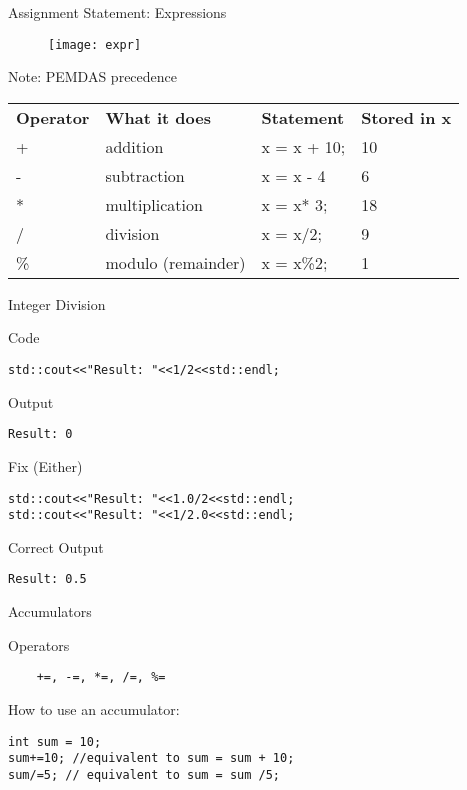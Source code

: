 \documentclass[xcolor={dvipsnames}]{beamer}
\begin{document}
\begin{frame}{Assignment Statement: Expressions}
\begin{figure}
	\texttt{[image: expr]}
\end{figure}

\begin{block}{Note: PEMDAS precedence}
	\begin{tabularx}{\textwidth}{X X X X}
		\textbf{Operator} & \textbf{What it does} & \textbf{Statement} & \textbf{Stored in x}\\
		+ & addition & x = x + 10; & 10 \\
		- & subtraction & x = x - 4 & 6 \\
		*& multiplication & x = x* 3; &  18 \\
		/ & division & x = x/2; & 9 \\
		\% & modulo (remainder) &  x = x\%2; & 1 \\  
	\end{tabularx}
\end{block}
\end{frame}

\begin{frame}[fragile]{Integer Division}
\begin{block}{Code}
\begin{verbatim}
std::cout<<"Result: "<<1/2<<std::endl;
\end{verbatim}
\end{block}
\pause
\begin{block}{Output}
\begin{verbatim}
Result: 0
\end{verbatim}
\end{block}
\pause
\begin{block}{Fix (Either)}
\begin{verbatim}
std::cout<<"Result: "<<1.0/2<<std::endl;
std::cout<<"Result: "<<1/2.0<<std::endl;
\end{verbatim}
\end{block}
\begin{block}{Correct Output}
\begin{verbatim}
Result: 0.5
\end{verbatim}
\end{block}

\end{frame}

\begin{frame}[fragile]{Accumulators}
\begin{block}{Operators}
\huge
\begin{verbatim}	
	+=, -=, *=, /=, %=
\end{verbatim}

\end{block}
	
\begin{block}{How to use an accumulator:}
\begin{verbatim}
int sum = 10;
sum+=10; //equivalent to sum = sum + 10;
sum/=5; // equivalent to sum = sum /5;
\end{verbatim}
	\end{block}
\end{frame}
\end{document}
